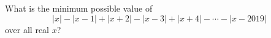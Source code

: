 What is the minimum possible value of \[\left|x\right|-\left|x-1\right|+\left|x+2\right|-\left|x-3\right|+\left|x+4\right|-\cdots-\left|x-2019\right|\] over all real $x$?